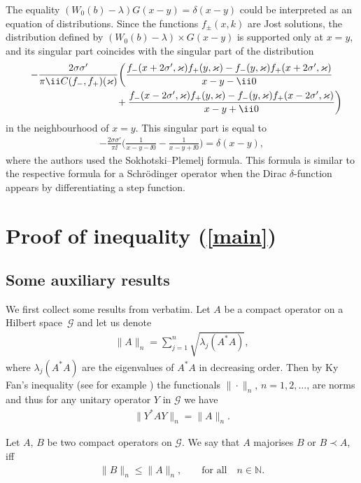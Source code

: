 The equality $(W_0(b) - \lambda)G(x-y) = \delta(x-y)$ could be interpreted as an equation of distributions.
Since the functions $f_{\pm}(x,k)$ are Jost solutions, the distribution defined by $(W_0(b) - \lambda)\times G(x-y)$ is supported only at $x = y$, and its singular part coincides with the singular part of the distribution
\begin{gather*}
-\frac{2\sigma\sigma'}{\pi \ii C(f_-,f_+)(\varkappa)} \bigg(\frac{f_-(x+2\sigma',\varkappa) f_+(y,\varkappa)- f_-(y,\varkappa)f_+(x+2\sigma',\varkappa)}{x-y-\ii0}
\\ \hphantom{-\frac{2\sigma\sigma'}{\pi \ii C(f_-,f_+)(\varkappa)} \bigg(}
{} + \frac{f_-(x-2\sigma',\varkappa) f_+(y,\varkappa)
- f_-(y,\varkappa)f_+(x-2\sigma',\varkappa)}{x-y+\ii0}\bigg)
\end{gather*}
in the neighbourhood of $x = y$. This singular part is equal to
\begin{gather*}
-\frac{2\sigma\sigma'}{\pi \ii} \bigg(\frac{1}{x-y-\ii0} - \frac{1}{x-y+\ii0} \bigg) = \delta(x-y),
\end{gather*}
where the authors used the Sokhotski--Plemelj formula. This formula is similar to the respective formula for a Schr\"odinger operator when the Dirac $\delta$-function appears by differentiating a step function.

\section[Proof of inequality (1.2)]{Proof of inequality (\ref{main})}

\subsection{Some auxiliary results}
We first collect some results from \cite{HLW} verbatim.
Let $A$ be a compact operator on a Hilbert space~$\mathcal{G}$ and let us denote
\begin{gather*}
\|A\|_n=\sum_{j=1}^n\sqrt{\lambda_j(A^*A)},
\end{gather*}
where $\lambda_j(A^*A)$ are the eigenvalues of $A^*A$ in decreasing order.
Then by Ky Fan's inequality (see for example \cite[Lemma~4.2]{GK}) the functionals $\|\cdot\|_n$, $n = 1,2,\dots $,
are norms and thus for any unitary operator $Y$ in $\mathcal{G}$ we have
\begin{gather*}
\|Y^* A Y\|_n = \|A\|_n.
\end{gather*}

\begin{Definition}
Let $A$, $B$ be two compact operators on $\mathcal{G}$. We say that $A$ majorises $B$ or $B\prec A$, iff
\begin{gather*}
\|B\|_n \le \|A\|_n, \qquad \text{for all} \quad n \in \mathbb N.
\end{gather*}
\end{Definition}

